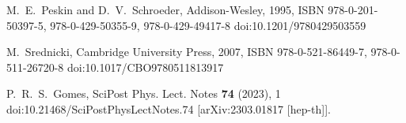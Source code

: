 \documentclass{article}
\theoremstyle{definition}
\numberwithin{equation}{section}
\begin{document}
\begin{thebibliography}{99}
M.~E.~Peskin and D.~V.~Schroeder,
Addison-Wesley, 1995,
ISBN 978-0-201-50397-5, 978-0-429-50355-9, 978-0-429-49417-8
doi:10.1201/9780429503559

M.~Srednicki,
Cambridge University Press, 2007,
ISBN 978-0-521-86449-7, 978-0-511-26720-8
doi:10.1017/CBO9780511813917

P.~R.~S.~Gomes,
SciPost Phys. Lect. Notes \textbf{74} (2023), 1
doi:10.21468/SciPostPhysLectNotes.74
[arXiv:2303.01817 [hep-th]].


\end{thebibliography}
\end{document}

